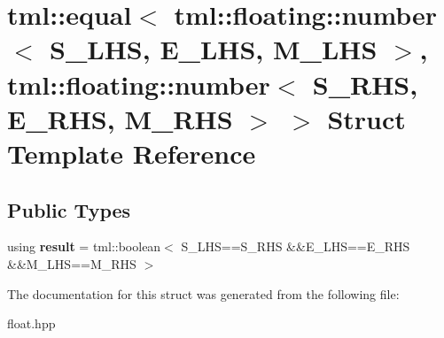 \hypertarget{structtml_1_1equal_3_01tml_1_1floating_1_1number_3_01S__LHS_00_01E__LHS_00_01M__LHS_01_4_00_01tm86cbd07f2d41896aa59b684cdc61d261}{\section{tml\+:\+:equal$<$ tml\+:\+:floating\+:\+:number$<$ S\+\_\+\+L\+H\+S, E\+\_\+\+L\+H\+S, M\+\_\+\+L\+H\+S $>$, tml\+:\+:floating\+:\+:number$<$ S\+\_\+\+R\+H\+S, E\+\_\+\+R\+H\+S, M\+\_\+\+R\+H\+S $>$ $>$ Struct Template Reference}
\label{structtml_1_1equal_3_01tml_1_1floating_1_1number_3_01S__LHS_00_01E__LHS_00_01M__LHS_01_4_00_01tm86cbd07f2d41896aa59b684cdc61d261}
}
\subsection*{Public Types}
\begin{DoxyCompactItemize}
\item 
\hypertarget{structtml_1_1equal_3_01tml_1_1floating_1_1number_3_01S__LHS_00_01E__LHS_00_01M__LHS_01_4_00_01tm86cbd07f2d41896aa59b684cdc61d261_a5d807f7a62c9549151ff253d04cf9398}{using {\bfseries result} = tml\+::boolean$<$ S\+\_\+\+L\+H\+S==S\+\_\+\+R\+H\+S \&\&E\+\_\+\+L\+H\+S==E\+\_\+\+R\+H\+S \&\&M\+\_\+\+L\+H\+S==M\+\_\+\+R\+H\+S $>$}\label{structtml_1_1equal_3_01tml_1_1floating_1_1number_3_01S__LHS_00_01E__LHS_00_01M__LHS_01_4_00_01tm86cbd07f2d41896aa59b684cdc61d261_a5d807f7a62c9549151ff253d04cf9398}

\end{DoxyCompactItemize}


The documentation for this struct was generated from the following file\+:\begin{DoxyCompactItemize}
\item 
float.\+hpp\end{DoxyCompactItemize}
